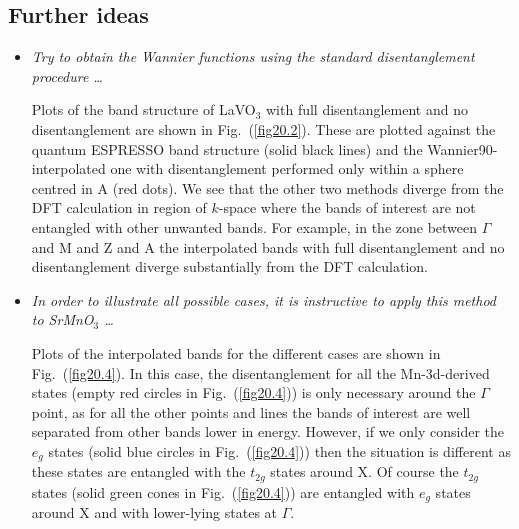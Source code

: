 \subsection*{Further ideas}
\begin{itemize}
	\item {\it Try to obtain the Wannier functions using the standard disentanglement procedure \dots}

	Plots of the band structure of LaVO$_3$ with full disentanglement and no disentanglement are shown in Fig.~(\ref{fig20.2}). These are plotted against the quantum ESPRESSO band structure (solid black lines) and the Wannier90-interpolated one with disentanglement performed only within a sphere centred in A (red dots). We see that the other two methods diverge from the DFT calculation in region of $k$-space where the bands of interest are not entangled with other unwanted bands. For example, in the zone between $\Gamma$ and M and Z and A the interpolated bands with full disentanglement and no disentanglement diverge substantially from the DFT calculation.  

	\item {\it In order to illustrate all possible cases, it is instructive to apply this method to SrMnO$_3$ \dots}

	Plots of the interpolated bands for the different cases are shown in Fig.~(\ref{fig20.4}). In this case, the disentanglement for all the Mn-3d-derived states (empty red circles in Fig.~(\ref{fig20.4})) is only necessary around the $\Gamma$ point, as for all the other points and lines the bands of interest are well separated from other bands lower in energy. However, if we only consider the $e_g$ states (solid blue circles in Fig.~(\ref{fig20.4})) then the situation is different as these states are entangled with the $t_{2g}$ states around X. Of course the $t_{2g}$ states (solid green cones in Fig.~(\ref{fig20.4})) are entangled with $e_{g}$ states around X and with lower-lying states at $\Gamma$.

\end{itemize}

